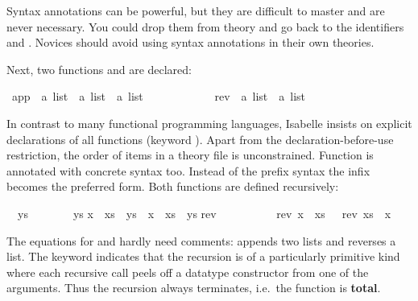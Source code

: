 \begin{isabellebody}
\begin{isamarkuptext}
\begin{warn}
  Syntax annotations can be powerful, but they are difficult to master and 
  are never necessary.  You
  could drop them from theory  and go back to the identifiers
   and .
  Novices should avoid using
  syntax annotations in their own theories.
\end{warn}
Next, two functions  and  are declared:%
\end{isamarkuptext}%
\isamarkuptrue%
\ app\ {\isacharcolon}{\isacharcolon}\ {\isachardoublequote}{\isacharprime}a\ list\ {\isasymRightarrow}\ {\isacharprime}a\ list\ {\isasymRightarrow}\ {\isacharprime}a\ list{\isachardoublequote}\ \ \ {\isacharparenleft}\ {\isachardoublequote}{\isacharat}{\isachardoublequote}\ {}{}{\isacharparenright}\isanewline
\ \ \ \ \ \ \ rev\ {\isacharcolon}{\isacharcolon}\ {\isachardoublequote}{\isacharprime}a\ list\ {\isasymRightarrow}\ {\isacharprime}a\ list{\isachardoublequote}\isamarkupfalse%
%
\begin{isamarkuptext}%
\noindent
In contrast to many functional programming languages,
Isabelle insists on explicit declarations of all functions
(keyword ).  Apart from the declaration-before-use
restriction, the order of items in a theory file is unconstrained. Function
 is annotated with concrete syntax too. Instead of the
prefix syntax  the infix
 becomes the preferred
form. Both functions are defined recursively:%
\end{isamarkuptext}%
\isamarkuptrue%
\isanewline
{\isachardoublequote}{\isacharbrackleft}{\isacharbrackright}\ {\isacharat}\ ys\ \ \ \ \ \ \ {\isacharequal}\ ys{\isachardoublequote}\isanewline
{\isachardoublequote}{\isacharparenleft}x\ {\isacharhash}\ xs{\isacharparenright}\ {\isacharat}\ ys\ {\isacharequal}\ x\ {\isacharhash}\ {\isacharparenleft}xs\ {\isacharat}\ ys{\isacharparenright}{\isachardoublequote}\isanewline
\isanewline
\isamarkupfalse%
\isanewline
{\isachardoublequote}rev\ {\isacharbrackleft}{\isacharbrackright}\ \ \ \ \ \ \ \ {\isacharequal}\ {\isacharbrackleft}{\isacharbrackright}{\isachardoublequote}\isanewline
{\isachardoublequote}rev\ {\isacharparenleft}x\ {\isacharhash}\ xs{\isacharparenright}\ \ {\isacharequal}\ {\isacharparenleft}rev\ xs{\isacharparenright}\ {\isacharat}\ {\isacharparenleft}x\ {\isacharhash}\ {\isacharbrackleft}{\isacharbrackright}{\isacharparenright}{\isachardoublequote}\isamarkupfalse%
%
\begin{isamarkuptext}%
\noindent{}
The equations for  and  hardly need comments:
 appends two lists and  reverses a list.  The
keyword  indicates that the recursion is
of a particularly primitive kind where each recursive call peels off a datatype
constructor from one of the arguments.  Thus the
recursion always terminates, i.e.\ the function is \textbf{total}.


\end{isamarkuptext}
\end{isabellebody}
